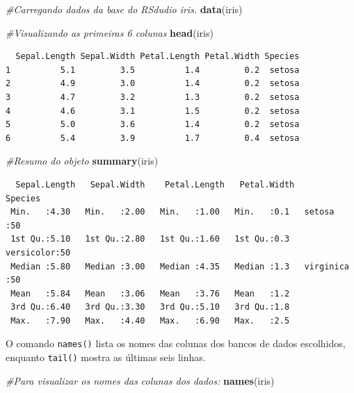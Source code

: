 \documentclass[12pt,portuguese,oneside]{book}
\newenvironment{Shaded}{\begin{snugshade}}{\end{snugshade}}
\newcommand{\KeywordTok}[1]{\textcolor[rgb]{0.13,0.29,0.53}{\textbf{#1}}}
\newcommand{\CommentTok}[1]{\textcolor[rgb]{0.56,0.35,0.01}{\textit{#1}}}
\newcommand{\NormalTok}[1]{#1}
\begin{document}
\begin{Shaded}
\begin{Highlighting}[]
\CommentTok{#Carregando dados da base do RSdudio iris.}
\KeywordTok{data}\NormalTok{(iris)}

\CommentTok{#Visualizando as primeiras 6 colunas}
\KeywordTok{head}\NormalTok{(iris)}
\end{Highlighting}
\end{Shaded}

\begin{verbatim}
  Sepal.Length Sepal.Width Petal.Length Petal.Width Species
1          5.1         3.5          1.4         0.2  setosa
2          4.9         3.0          1.4         0.2  setosa
3          4.7         3.2          1.3         0.2  setosa
4          4.6         3.1          1.5         0.2  setosa
5          5.0         3.6          1.4         0.2  setosa
6          5.4         3.9          1.7         0.4  setosa
\end{verbatim}

\begin{Shaded}
\begin{Highlighting}[]
\CommentTok{#Resumo do objeto}
\KeywordTok{summary}\NormalTok{(iris)}
\end{Highlighting}
\end{Shaded}

\begin{verbatim}
  Sepal.Length   Sepal.Width    Petal.Length   Petal.Width        Species  
 Min.   :4.30   Min.   :2.00   Min.   :1.00   Min.   :0.1   setosa    :50  
 1st Qu.:5.10   1st Qu.:2.80   1st Qu.:1.60   1st Qu.:0.3   versicolor:50  
 Median :5.80   Median :3.00   Median :4.35   Median :1.3   virginica :50  
 Mean   :5.84   Mean   :3.06   Mean   :3.76   Mean   :1.2                  
 3rd Qu.:6.40   3rd Qu.:3.30   3rd Qu.:5.10   3rd Qu.:1.8                  
 Max.   :7.90   Max.   :4.40   Max.   :6.90   Max.   :2.5                  
\end{verbatim}

O comando \texttt{names()} lista os nomes das colunas dos bancos de
dados escolhidos, enquanto \texttt{tail()} mostra as últimas seis
linhas.

\begin{Shaded}
\begin{Highlighting}[]
\CommentTok{#Para visualizar os nomes das colunas dos dados:}
\KeywordTok{names}\NormalTok{(iris)}
\end{Highlighting}
\end{Shaded}
\end{document}
